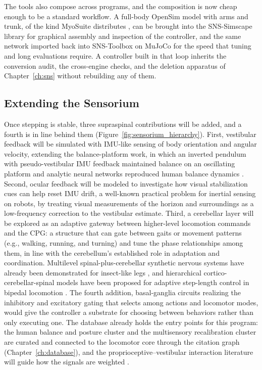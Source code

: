 The tools also compose across programs, and the composition is now cheap enough to be a standard workflow. A full-body OpenSim model with arms and trunk, of the kind MyoSuite distributes \citep{caggiano_myosuite_2022}, can be brought into the SNS-Simscape library for graphical assembly and inspection of the controller, and the same network imported back into SNS-Toolbox on MuJoCo \citep{nourse_sns_2023} for the speed that tuning and long evaluations require. A controller built in that loop inherits the conversion audit, the cross-engine checks, and the deletion apparatus of Chapter~\ref{ch:sns} without rebuilding any of them.

\subsection{Extending the Sensorium}\label{sec:fw_senses}

Once stepping is stable, three supraspinal contributions will be added, and a fourth is in line behind them (Figure~\ref{fig:sensorium_hierarchy}). First, vestibular feedback will be simulated with IMU-like sensing of body orientation and angular velocity, extending the balance-platform work, in which an inverted pendulum with pseudo-vestibular IMU feedback maintained balance on an oscillating platform \citep{bolen_balance_2024, bolen_selfbalancing_2024, bolen_selfbalancing_srs_2024} and analytic neural networks reproduced human balance dynamics \citep{hilts_dynamic_2019}. Second, ocular feedback will be modeled to investigate how visual stabilization cues can help reset IMU drift, a well-known practical problem for inertial sensing on robots, by treating visual measurements of the horizon and surroundings as a low-frequency correction to the vestibular estimate. Third, a cerebellar layer will be explored as an adaptive gateway between higher-level locomotion commands and the CPG: a structure that can gate between gaits or movement patterns (e.g., walking, running, and turning) and tune the phase relationships among them, in line with the cerebellum's established role in adaptation and coordination. Multilevel spinal-plus-cerebellar synthetic nervous systems have already been demonstrated for insect-like legs \citep{grummer_multilevel_2024}, and hierarchical cortico-cerebellar-spinal models have been proposed for adaptive step-length control in bipedal locomotion \citep{chen_corticocerebellar_2025}. The fourth addition, basal-ganglia circuits realizing the inhibitory and excitatory gating that selects among actions and locomotor modes, would give the controller a substrate for choosing between behaviors rather than only executing one. The database already holds the entry points for this program: the human balance and posture cluster and the multisensory recalibration cluster are curated and connected to the locomotor core through the citation graph (Chapter~\ref{ch:database}), and the proprioceptive--vestibular interaction literature will guide how the signals are weighted \citep{akay_relative_2021}.

